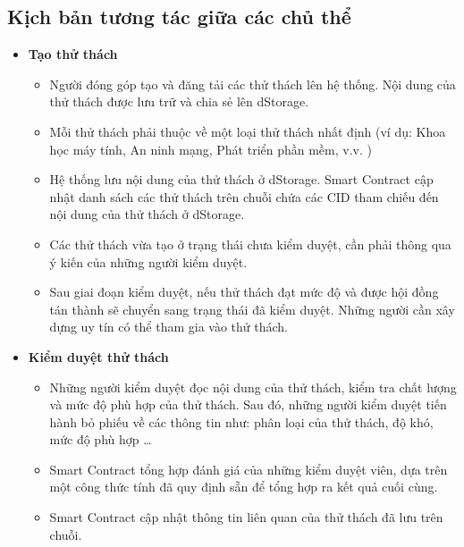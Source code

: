 \subsection{Kịch bản tương tác giữa các chủ thể}
\begin{itemize}
  \item \textbf{Tạo thử thách}
        \begin{itemize}
          \item Người đóng góp tạo và đăng tải các thử thách lên hệ thống. Nội dung của thử thách được lưu trữ và chia sẻ lên dStorage.
          \item Mỗi thử thách phải thuộc về một loại thử thách nhất định (ví dụ: Khoa học máy tính, An ninh mạng, Phát triển phần mềm, v.v. )
          \item Hệ thống lưu nội dung của thử thách ở dStorage. Smart Contract cập nhật danh sách các thử thách trên chuỗi chứa các CID tham chiếu đến nội dung của thử thách ở dStorage.
          \item Các thử thách vừa tạo ở trạng thái chưa kiểm duyệt, cần phải thông qua ý kiến của những người kiểm duyệt.
          \item Sau giai đoạn kiểm duyệt, nếu thử thách đạt mức độ và được hội đồng tán thành sẽ chuyển sang trạng thái đã kiểm duyệt. Những người cần xây dựng uy tín có thể tham gia vào thử thách.
        \end{itemize}

  \item \textbf{Kiểm duyệt thử thách}
        \begin{itemize}
          \item Những người kiểm duyệt đọc nội dung của thử thách, kiểm tra chất lượng và mức độ phù hợp của thử thách. Sau đó, những người kiểm duyệt tiến hành bỏ phiếu về các thông tin như: phân loại của thử thách, độ khó, mức độ phù hợp \dots
          \item Smart Contract tổng hợp đánh giá của những kiểm duyệt viên, dựa trên một công thức tính đã quy định sẵn để tổng hợp ra kết quả cuối cùng.
          \item Smart Contract cập nhật thông tin liên quan của thử thách đã lưu trên chuỗi.
        \end{itemize}


\end{itemize}
